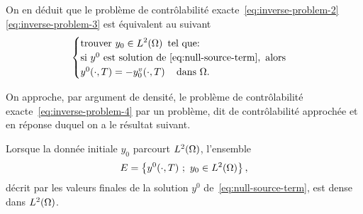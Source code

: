 \begin{remarque}
    On en déduit que le problème de contrôlabilité
    exacte~\eqref{eq:inverse-problem-2}\eqref{eq:inverse-problem-3} est
    équivalent au suivant
    \begin{equation}\label{eq:inverse-problem-4}
        \begin{cases}\displaystyle
            \text{trouver}\ y_{0}\in L^{2}\!\left({\Omega}\right)\ \text{tel que:}\\
            \text{si}\ y^{0}\ \text{est solution
            de}~\eqref{eq:null-source-term},\ \text{alors}\\
            y^{0}\!\left({\cdot,T}\right) = -y_{0}^{v}\!\left({\cdot,
            T}\right)\quad \text{dans}\ \Omega.
        \end{cases}
    \end{equation}
\end{remarque}


On approche, par argument de densité, le problème de contrôlabilité
exacte~\eqref{eq:inverse-problem-4} par un problème, dit de contrôlabilité
approchée et en réponse duquel on a le résultat suivant.

\begin{proposition}\label{propo:controllability-result-1}%
    Lorsque la donnée initiale $y_{0}$ parcourt $L^{2}\!\left({\Omega}\right)$,
    l'ensemble
    \begin{equation*}\label{eq:controllability-result-1}
        E = \left\{{%
            y^{0}\!\left({\cdot,T}\right)\,;\ y_{0}\in\Ldeux{\Omega}
        }\right\},
    \end{equation*}
    décrit par les valeurs finales de la solution $y^{0}$
    de~\eqref{eq:null-source-term}, est dense dans $L^{2}\!\left({\Omega}\right)$.
\end{proposition}


